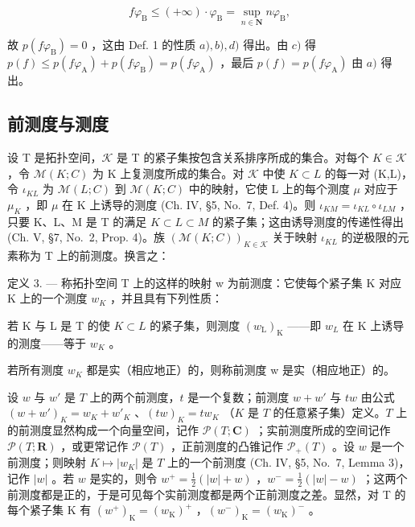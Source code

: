 \[
f \varphi_ {\mathrm{B}} \leqslant (+ \infty) \cdot \varphi_ {\mathrm{B}} = \sup _ {n \in \mathbf {N}} n \varphi_ {\mathrm{B}},
\]

故 \(p(f\varphi_{\mathrm{B}}) = 0\) ，这由 Def. 1 的性质 \(a), b), d)\) 得出。由 \(c)\) 得 \(p(f) \leqslant p(f\varphi_{\mathrm{A}}) + p(f\varphi_{\mathrm{B}}) = p(f\varphi_{\mathrm{A}})\) ，最后 \(p(f) = p(f\varphi_{\mathrm{A}})\) 由 \(a)\) 得出。

\subsection{前测度与测度}

设 T 是拓扑空间，\(\mathcal{K}\) 是 T 的紧子集按包含关系排序所成的集合。对每个 \(K\in\mathcal{K}\) ，令 \(\mathcal{M}(K;C)\) 为 K 上复测度所成的集合。对 \(\mathcal{K}\) 中使 \(K\subset L\) 的每一对 (K,L)，令 \(\iota_{KL}\) 为 \(\mathcal{M}(L;C)\) 到 \(\mathcal{M}(K;C)\) 中的映射，它使 L 上的每个测度 \(\mu\) 对应于 \(\mu_{K}\) ，即 \(\mu\) 在 K 上诱导的测度 (Ch. IV, §5, No.~7, Def. 4)。则 \(\iota_{KM}=\iota_{KL}\circ\iota_{LM}\) ，只要 K、L、M 是 T 的满足 \(K\subset L\subset M\) 的紧子集；这由诱导测度的传递性得出 (Ch. V, §7, No.~2, Prop. 4)。族 \((\mathcal{M}(K;C))_{K\in\mathcal{K}}\) 关于映射 \(\iota_{KL}\) 的逆极限的元素称为 T 上的前测度。换言之：

定义 3. --- 称拓扑空间 T 上的这样的映射 w 为前测度：它使每个紧子集 K 对应 K 上的一个测度 \(w_{K}\) ，并且具有下列性质：

若 K 与 L 是 T 的使 \(K \subset L\) 的紧子集，则测度 \((w_{\mathrm{L}})_{\mathrm{K}}\) ——即 \(w_{L}\) 在 K 上诱导的测度——等于 \(w_{K}\) 。

若所有测度 \(w_{K}\) 都是实（相应地正）的，则称前测度 w 是实（相应地正）的。

设 \(w\) 与 \(w'\) 是 \(T\) 上的两个前测度，\(t\) 是一个复数；前测度 \(w + w'\) 与 \(tw\) 由公式 \((w + w')_K = w_K + w'_K\) 、\((tw)_K = tw_K\) （\(K\) 是 \(T\) 的任意紧子集）定义。\(T\) 上的前测度显然构成一个向量空间，记作 \(\mathcal{P}(T; \mathbf{C})\) ；实前测度所成的空间记作 \(\mathcal{P}(T; \mathbf{R})\) ，或更常记作 \(\mathcal{P}(T)\) ，正前测度的凸锥记作 \(\mathcal{P}_+(T)\) 。设 \(w\) 是一个前测度；则映射 \(K \mapsto |w_K|\) 是 \(T\) 上的一个前测度 (Ch. IV, §5, No.~7, Lemma 3)，记作 \(|w|\) 。若 \(w\) 是实的，则令 \(w^{+} = \frac{1}{2} (|w| + w)\) ，\(w^{-} = \frac{1}{2} (|w| - w)\) ；这两个前测度都是正的，于是可见每个实前测度都是两个正前测度之差。显然，对 T 的每个紧子集 K 有 \((w^{+})_{\mathrm{K}} = (w_{\mathrm{K}})^{+}\) ，\((w^{-})_{\mathrm{K}} = (w_{\mathrm{K}})^{-}\) 。


